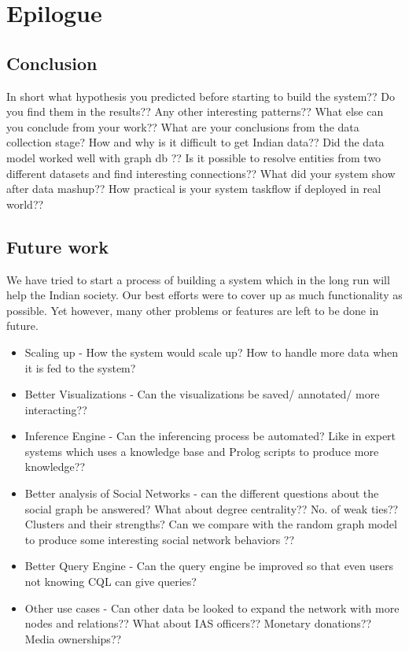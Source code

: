\chapter{Epilogue}
\section{Conclusion}
 In short what hypothesis you predicted before starting to build the system?? Do you find them in the results?? Any other interesting patterns?? 
What else can you conclude from your work?? What are your conclusions from the data collection stage? How and why is it difficult to get Indian data?? Did the data model worked well with graph db ?? Is it possible to resolve entities from two different datasets and find interesting connections??  What did your system show after data mashup?? How practical is your system taskflow if deployed in real world??

\section{Future work}
We have tried to start a process of building a system which in the long run will help the Indian society. Our best efforts were to cover up as much functionality as possible. Yet however, many other problems or features are left to be done in future.
\begin{itemize}
\item Scaling up - How the system would scale up? How to handle more data when it is fed to the system?
\item Better Visualizations - Can the visualizations be saved/ annotated/ more interacting??
\item Inference Engine - Can the inferencing process be automated? Like in expert systems which uses a knowledge base and Prolog scripts to produce more knowledge??
\item Better analysis of Social Networks - can the different questions about the social graph be answered? What about degree centrality?? No. of weak ties?? Clusters and their strengths? Can we compare with the random graph model to produce some interesting social network behaviors ??
\item Better Query Engine - Can the query engine be improved so that even users not knowing CQL can give queries?
\item Other use cases - Can other data be looked to expand the network with more nodes and relations?? What about IAS officers?? Monetary donations?? Media ownerships??
\end{itemize}
